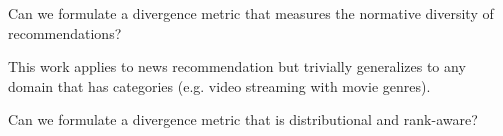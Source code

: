 \begin{question}
  Can we formulate a divergence metric that measures the normative diversity of recommendations?
\end{question}

This work applies to news recommendation but trivially generalizes to any domain that has categories (e.g. video streaming with movie genres).

Can we formulate a divergence metric that is distributional and rank-aware?











